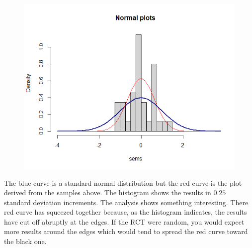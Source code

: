 \documentclass[a4paper,twosided,notoc]{tufte-book}
\begin{document}
\begin{figure}
	\centering
	\includegraphics[width=0.7\linewidth]{screenshot001}
	\caption{}
	\label{fig:screenshot001}
\end{figure}
The blue curve is a standard normal distribution but the red curve is the plot derived from the samples above. The histogram shows the results in $0.25$ standard deviation increments. The analysis shows something interesting. There red curve has squeezed together because, as the histogram indicates, the results have cut off abruptly at the edges. If the RCT were random, you would expect more results around the edges which would tend to spread the red curve toward the black one.
\end{document}
